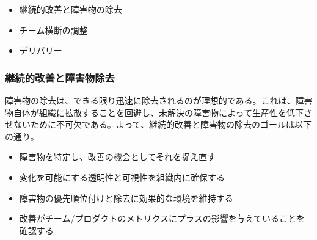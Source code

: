 \documentclass[12pt,a4paper,parskip=full]{scrartcl}
\begin{document}
\begin{itemize}
\itemsep1pt\parskip0pt

\item
継続的改善と障害物の除去
\item
チーム横断の調整
\item
デリバリー
\end{itemize}

\subsubsection{継続的改善と障害物除去}\label{Continuous-improvement-and-impediment-removal}

障害物の除去は、できる限り迅速に除去されるのが理想的である。これは、障害物自体が組織に拡散することを回避し、未解決の障害物によって生産性を低下させないために不可欠である。よって、継続的改善と障害物の除去のゴールは以下の通り。


\begin{itemize}
\itemsep1pt\parskip0pt

\item
障害物を特定し、改善の機会としてそれを捉え直す
\item
変化を可能にする透明性と可視性を組織内に確保する
\item
障害物の優先順位付けと除去に効果的な環境を維持する
\item
改善がチーム/プロダクトのメトリクスにプラスの影響を与えていることを確認する
\end{itemize}
\end{document}
